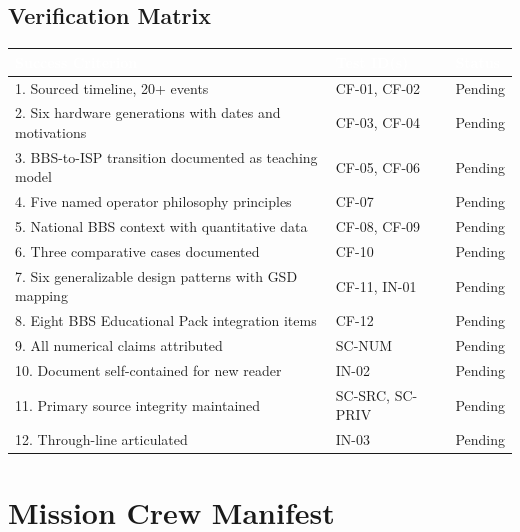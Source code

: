 \documentclass[11pt,letterpaper]{article}
\newcommand{\tableheader}[1]{\textbf{\sffamily\textcolor{white}{#1}}}
\begin{document}
\subsection{Verification Matrix}

\begin{center}
\begin{tabularx}{\textwidth}{XL{3.5cm}C{1.5cm}}
\toprule
{}
\tableheader{Success Criterion} & \tableheader{Test ID(s)} & \tableheader{Status} \\
. Sourced timeline, 20+ events & CF-01, CF-02 & Pending \\
2. Six hardware generations with dates and motivations & CF-03, CF-04 & Pending \\
3. BBS-to-ISP transition documented as teaching model & CF-05, CF-06 & Pending \\
4. Five named operator philosophy principles & CF-07 & Pending \\
5. National BBS context with quantitative data & CF-08, CF-09 & Pending \\
6. Three comparative cases documented & CF-10 & Pending \\
7. Six generalizable design patterns with GSD mapping & CF-11, IN-01 & Pending \\
8. Eight BBS Educational Pack integration items & CF-12 & Pending \\
9. All numerical claims attributed & SC-NUM & Pending \\
10. Document self-contained for new reader & IN-02 & Pending \\
11. Primary source integrity maintained & SC-SRC, SC-PRIV & Pending \\
12. Through-line articulated & IN-03 & Pending \\
\bottomrule
\end{tabularx}
\end{center}

\section{Mission Crew Manifest}
\end{document}
